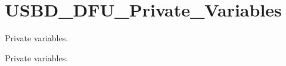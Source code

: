 \hypertarget{group__USBD__DFU__Private__Variables}{}\section{U\+S\+B\+D\+\_\+\+D\+F\+U\+\_\+\+Private\+\_\+\+Variables}
\label{group__USBD__DFU__Private__Variables}


Private variables.  


Private variables. 


